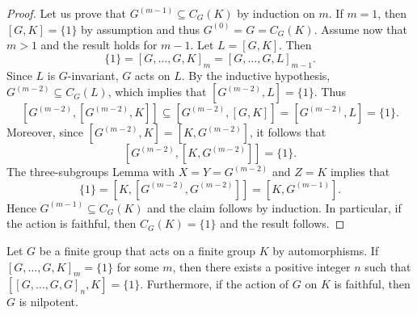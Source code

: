\begin{proof}
	Let us prove that $G^{(m-1)}\subseteq  C_G(K)$ by induction on $m$. If $m=1$, then 
	$[G,K]=\{1\}$ by assumption and thus 
	$G^{(0)}=G=C_G(K)$. Assume now that $m>1$ and the result holds for $m-1$. Let $L=[G,K]$. Then
	\[
	\{1\}=[G,\dots,G,K]_m=[G,\dots,G,L]_{m-1}.
	\]
	Since $L$ is $G$-invariant, $G$ acts on $L$. 
	By the inductive hypothesis, $G^{(m-2)}\subseteq C_G(L)$, which 
	implies that $[G^{(m-2)},L]=\{1\}$. Thus 
	\[
	[G^{(m-2)},[G^{(m-2)},K]]\subseteq [G^{(m-2)},[G,K]]=[G^{(m-2)},L]=\{1\}.
	\]
	Moreover, since $[G^{(m-2)},K]=[K,G^{(m-2)}]$, 
	it follows that 
	\[
	[G^{(m-2)},[K,G^{(m-2)}]]=\{1\}.
	\]
	The three-subgroups Lemma
	with $X=Y=G^{(m-2)}$ and $Z=K$ implies that 
	\[
	\{1\}=[K,[G^{(m-2)},G^{(m-2)}]]=[K,G^{(m-1)}].
	\]  
	Hence $G^{(m-1)}\subseteq C_G(K)$ and the claim follows by induction.  In particular, if the action is faithful, 
	then $C_G(K)=\{1\}$ and the result follows. 
\end{proof}


\begin{theorem}[Hall] \label{thm:Hallnilpotent}
	Let $G$ be a finite group that acts on a finite group $K$ by automorphisms. 
	If $[G,\dots,G,K]_m=\{1\}$ for some $m$, then there exists a positive integer $n$ such that $[[G,\dots,G,G]_n,K]=\{ 1\}$. Furthermore, if the action of $G$ on $K$ is faithful, then $G$ is nilpotent. 
\end{theorem}

